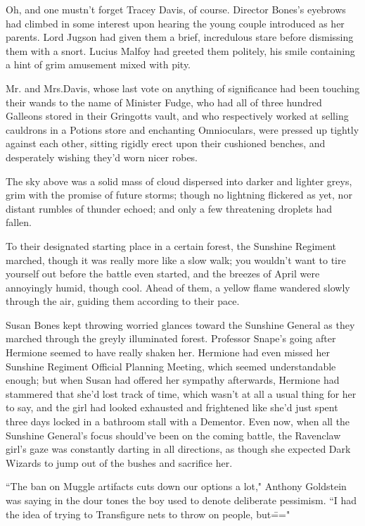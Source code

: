 Oh, and one mustn't forget Tracey Davis, of course. Director Bones's eyebrows had climbed in some interest upon hearing the young couple introduced as her parents. Lord Jugson had given them a brief, incredulous stare before dismissing them with a snort. Lucius Malfoy had greeted them politely, his smile containing a hint of grim amusement mixed with pity.

Mr. and Mrs.\?Davis, whose last vote on anything of significance had been touching their wands to the name of Minister Fudge, who had all of three hundred Galleons stored in their Gringotts vault, and who respectively worked at selling cauldrons in a Potions store and enchanting Omnioculars, were pressed up tightly against each other, sitting rigidly erect upon their cushioned benches, and desperately wishing they'd worn nicer robes.

The sky above was a solid mass of cloud dispersed into darker and lighter greys, grim with the promise of future storms; though no lightning flickered as yet, nor distant rumbles of thunder echoed; and only a few threatening droplets had fallen.

\later

To their designated starting place in a certain forest, the Sunshine Regiment marched, though it was really more like a slow walk; you wouldn't want to tire yourself out before the battle even started, and the breezes of April were annoyingly humid, though cool. Ahead of them, a yellow flame wandered slowly through the air, guiding them according to their pace.

Susan Bones kept throwing worried glances toward the Sunshine General as they marched through the greyly illuminated forest. Professor Snape's going after Hermione seemed to have really shaken her. Hermione had even missed her Sunshine Regiment Official Planning Meeting, which seemed understandable enough; but when Susan had offered her sympathy afterwards, Hermione had stammered that she'd lost track of time, which wasn't at all a usual thing for her to say, and the girl had looked exhausted and frightened like she'd just spent three days locked in a bathroom stall with a Dementor. Even now, when all the Sunshine General's focus should've been on the coming battle, the Ravenclaw girl's gaze was constantly darting in all directions, as though she expected Dark Wizards to jump out of the bushes and sacrifice her.

``The ban on Muggle artifacts cuts down our options a lot," Anthony Goldstein was saying in the dour tones the boy used to denote deliberate pessimism. ``I had the idea of trying to Transfigure nets to throw on people, but\==="

